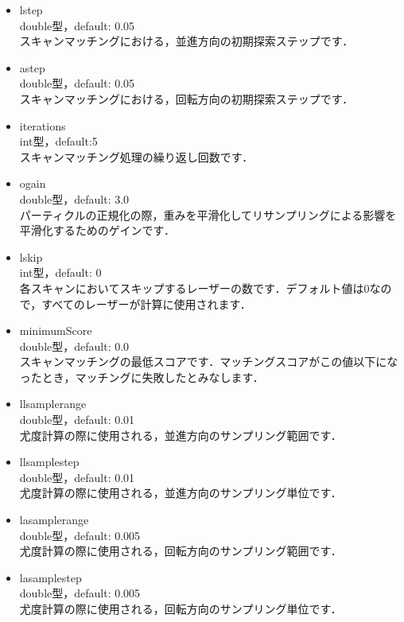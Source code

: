 \documentclass[{../../master}]{subfiles}
\begin{document}
\begin{itemize}
  \item \textsf{lstep} \\
    double型，default: 0.05 \\
    スキャンマッチングにおける，並進方向の初期探索ステップです．
  \item \textsf{astep} \\
    double型，default: 0.05 \\
    スキャンマッチングにおける，回転方向の初期探索ステップです．
  \item \textsf{iterations} \\
    int型，default:5 \\
    スキャンマッチング処理の繰り返し回数です．
  \item \textsf{ogain} \\
    double型，default: 3.0 \\
    パーティクルの正規化の際，重みを平滑化してリサンプリングによる影響を平滑化するためのゲインです．
  \item \textsf{lskip} \\
    int型，default: 0 \\
    各スキャンにおいてスキップするレーザーの数です．デフォルト値は0なので，すべてのレーザーが計算に使用されます．
  \item \textsf{minimumScore} \\
    double型，default: 0.0 \\
    スキャンマッチングの最低スコアです．マッチングスコアがこの値以下になったとき，マッチングに失敗したとみなします．
  \item \textsf{llsamplerange} \\
    double型，default: 0.01 \\
    尤度計算の際に使用される，並進方向のサンプリング範囲です．
  \item \textsf{llsamplestep} \\
    double型，default: 0.01 \\
    尤度計算の際に使用される，並進方向のサンプリング単位です．
  \item \textsf{lasamplerange} \\
    double型，default: 0.005 \\
    尤度計算の際に使用される，回転方向のサンプリング範囲です．
  \item \textsf{lasamplestep} \\
    double型，default: 0.005 \\
    尤度計算の際に使用される，回転方向のサンプリング単位です．
\end{itemize}
\end{document}
